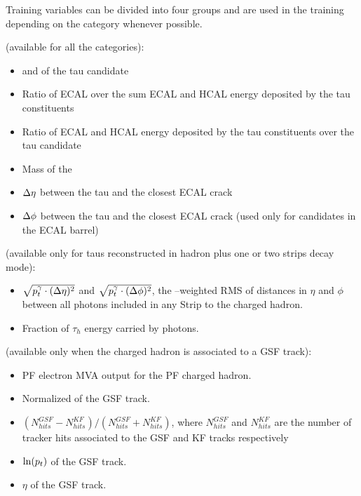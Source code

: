 Training variables can be divided into four groups and are used in the training depending on the category whenever possible.

 (available for all the categories):
\begin{itemize}
\item \pT and \Eta of the tau candidate
\item Ratio of ECAL over the sum ECAL and HCAL energy deposited by the tau constituents
\item Ratio of ECAL and HCAL energy deposited by the tau constituents over the tau candidate \pT
\item Mass of the \tauh
\item $\Delta\eta$ between the tau and the closest ECAL crack
\item $\Delta\phi$ between the tau and the closest ECAL crack (used only for candidates in the ECAL barrel)
\end{itemize}

 (available only for taus reconstructed in hadron plus one or two strips decay mode):
\begin{itemize}
\item $\sqrt{p_{t}^{\gamma} \cdot (\Delta\eta)^{2}}$ and $\sqrt{p_{t}^{\gamma} \cdot (\Delta\phi)^{2}}$, 
  the \pT--weighted RMS of distances in $\eta$ and $\phi$ between all photons included in any Strip to the charged hadron.
\item Fraction of $\tau_{h}$ energy carried by photons.
\end{itemize}

 (available only when the charged hadron is associated to a GSF track):
\begin{itemize}
\item PF electron MVA output for the PF charged hadron.
\item Normalized \chisq of the GSF track. 
\item $(N_{hits}^{GSF} - N_{hits}^{KF})/(N_{hits}^{GSF} + N_{hits}^{KF})$, where $N_{hits}^{GSF}$ and $N_{hits}^{KF}$ are the number of tracker hits associated to the GSF and KF tracks respectively
\item $\ln (p_{t})$ of the GSF track.
\item $\eta$ of the GSF track.
\end{itemize}

